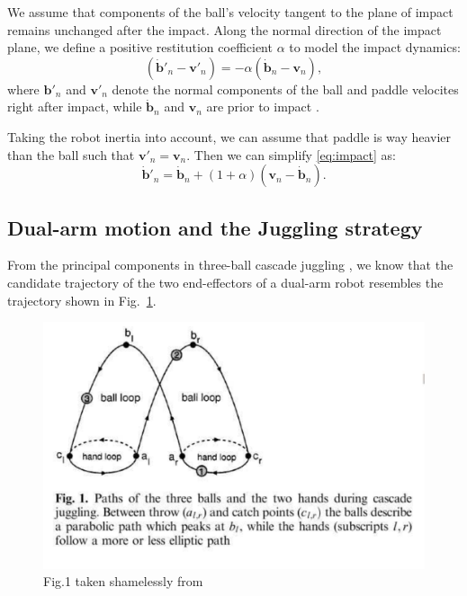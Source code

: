 \documentclass[letterpaper, 10 pt, conference]{ieeeconf}  %
\newcommand{\bs}{\boldsymbol}
\begin{document}
We assume that components of the ball's velocity tangent to the plane of impact remains unchanged after the impact. Along the normal direction of the impact plane, we define a positive restitution coefficient $\alpha$ to model the impact dynamics: 
\begin{equation}
\label{eq:impact}
(\dot{\bs{b}}'_n - \bs{v}'_n )= -\alpha(\dot{\bs{b}}_n - \bs{v}_n),
\end{equation}
where $\bs{b}'_n$ and $\bs{v}'_n$ denote the normal components of the ball and paddle velocites right after impact, while  $\dot{\bs{b}}_n$ and $\bs{v}_n$ are prior to impact \cite{rizzi1992distributed}. 

Taking the robot inertia into account, we can assume that paddle is way heavier than the ball such that $\bs{v}'_n = \bs{v}_n$. Then we can simplify \eqref{eq:impact} as: 
\begin{equation}
\label{eq:impact_new}
\dot{\bs{b}}'_n = \dot{\bs{b}}_n + (1 + \alpha) (\bs{v}_n - \dot{\bs{b}}_n).
\end{equation}
\subsection{Dual-arm motion and the Juggling strategy}
\label{sec:dual-arm}
From the principal components in three-ball cascade juggling 
\cite{post2000principal},
we know that the candidate trajectory of the two end-effectors of a dual-arm robot resembles the trajectory shown in  Fig.~\ref{fig:trajectory}.
\begin{figure}[htbp]
  \begin{center}
    \includegraphics[width=1.0\columnwidth, height=0.7\columnwidth]{fig/trajectory}
    \caption{
      Fig.1 taken shamelessly from \cite{post2000principal}
    }
     \label{fig:trajectory}
  \end{center}
\end{figure}
\end{document}
